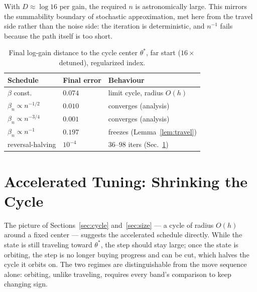 \documentclass[letterpaper, 10pt, conference, twocolumn]{ieeeconf}
\begin{document}
With $D \approx \log 16$ per gain, the required $n$ is astronomically large.
This mirrors the summability boundary of stochastic approximation, met here
from the travel side rather than the noise side: the iteration is
deterministic, and $n^{-1}$ fails because the path itself is too short.

\begin{table}[t]
\small
\centering
\caption{Final log-gain distance to the cycle center $\theta^*$, far start
($16\times$ detuned), regularized index.
}
\label{tab:schedules}
\begin{tabular}{lll}
\toprule
Schedule & Final error & Behaviour \\
\midrule
$\beta$ const.           & $0.074$ & limit cycle, radius $O(h)$ \\
$\beta_n \propto n^{-1/2}$ & $0.010$ & converges (analysis) \\
$\beta_n \propto n^{-3/4}$ & $0.001$ & converges (analysis) \\
$\beta_n \propto n^{-1}$   & $0.197$ & freezes (Lemma~\ref{lem:travel}) \\
reversal-halving         & $10^{-4}$ & $36$--$98$ iters (Sec.~\ref{sec:accel}) \\
\bottomrule
\end{tabular}
\end{table}

\section{Accelerated Tuning: Shrinking the Cycle}
\label{sec:accel}

The picture of Sections~\ref{sec:cycle} and~\ref{sec:size} --- a cycle of
radius $O(h)$ around a fixed center --- suggests the accelerated schedule
directly. While the state is still traveling toward $\theta^*$, the step
should stay large; once the state is orbiting, the step is no longer buying
progress and can be cut, which halves the cycle it orbits on. The two regimes
are distinguishable from the move sequence alone: orbiting, unlike traveling,
requires every band's comparison to keep changing sign.
\end{document}

